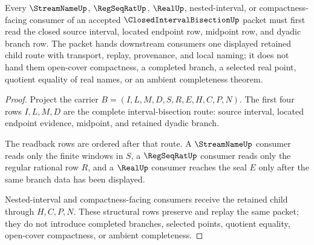\begin{theorem}
\label{thm:closed-interval-bisection-completion-handoff}
Every $\StreamNameUp$, $\RegSeqRatUp$, $\RealUp$, nested-interval, or compactness-facing consumer of an accepted $\ClosedIntervalBisectionUp$ packet must first read the closed source interval, located endpoint row, midpoint row, and dyadic branch row. The packet hands downstream consumers one displayed retained child route with transport, replay, provenance, and local naming; it does not hand them open-cover compactness, a completed branch, a selected real point, quotient equality of real names, or an ambient completeness theorem.
\end{theorem}
\begin{proof}
Project the carrier $B=(I,L,M,D,S,R,E,H,C,P,N)$. The first four rows $I,L,M,D$ are the complete interval-bisection route: source interval, located endpoint evidence, midpoint, and retained dyadic branch.

The readback rows are ordered after that route. A $\StreamNameUp$ consumer reads only the finite windows in $S$, a $\RegSeqRatUp$ consumer reads only the regular rational row $R$, and a $\RealUp$ consumer reaches the seal $E$ only after the same branch data has been displayed.

Nested-interval and compactness-facing consumers receive the retained child through $H,C,P,N$. These structural rows preserve and replay the same packet; they do not introduce completed branches, selected points, quotient equality, open-cover compactness, or ambient completeness.
\end{proof}


